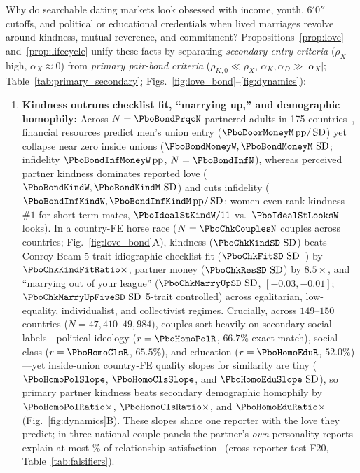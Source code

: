 Why do searchable dating markets look obsessed with income, youth, $6'0''$ cutoffs, and political or educational credentials when lived marriages revolve around kindness, mutual reverence, and commitment? Propositions~\ref{prop:love} and~\ref{prop:lifecycle} unify these facts by separating \emph{secondary entry criteria} ($\rho_X$ high, $\alpha_X\approx 0$) from \emph{primary pair-bond criteria} ($\rho_{K,0}\ll\rho_X$, $\alpha_K,\alpha_D\gg|\alpha_X|$; Table~\ref{tab:primary_secondary}; Figs.~\ref{fig:love_bond}--\ref{fig:dynamics}):
\begin{enumerate}[leftmargin=1.4em,itemsep=1.5pt,topsep=2pt]
\item \textbf{Kindness outruns checklist fit, ``marrying up,'' and demographic homophily:} Across $N=\PboBondPrqcN$ partnered adults in 175 countries~\cite{kowal2025}, financial resources predict men's union entry ($\PboDoorMoneyM\,\mathrm{pp}/\SD$) yet collapse near zero inside unions ($\PboBondMoneyW,\PboBondMoneyM\,\SD$; infidelity $\PboBondInfMoneyW\,\mathrm{pp}$, $N=\PboBondInfN$), whereas perceived partner kindness dominates reported love ($\PboBondKindW,\PboBondKindM\,\SD$) and cuts infidelity ($\PboBondInfKindW,\PboBondInfKindM\,\mathrm{pp}/\SD$; women even rank kindness $\#1$ for short-term mates, $\PboIdealStKindW/11$ vs.\ $\PboIdealStLooksW$ looks). In a country-FE horse race ($N=\PboChkCouplesN$ couples across \PboChkCountriesN{} countries; Fig.~\ref{fig:love_bond}A), kindness ($\PboChkKindSD\,\SD$) beats Conroy-Beam 5-trait idiographic checklist fit ($\PboChkFitSD\,\SD$~\cite{conroybeam2016}) by $\PboChkKindFitRatio\times$, partner money ($\PboChkResSD\,\SD$) by $8.5\times$, and ``marrying out of your league'' ($\PboChkMarryUpSD\,\SD$, $[-0.03,-0.01]$; $\PboChkMarryUpFiveSD\,\SD$ 5-trait controlled) across egalitarian, low-equality, individualist, and collectivist regimes. Crucially, across $149$--$150$ countries ($N=47{,}410$--$49{,}984$), couples sort heavily on secondary social labels---political ideology ($r=\PboHomoPolR$, $66.7\%$ exact match), social class ($r=\PboHomoClsR$, $65.5\%$), and education ($r=\PboHomoEduR$, $52.0\%$)---yet inside-union country-FE quality slopes for similarity are tiny ($\PboHomoPolSlope$, $\PboHomoClsSlope$, and $\PboHomoEduSlope\,\SD$), so primary partner kindness beats secondary demographic homophily by $\PboHomoPolRatio\times$, $\PboHomoClsRatio\times$, and $\PboHomoEduRatio\times$ (Fig.~\ref{fig:dynamics}B). These slopes share one reporter with the love they predict; in three national couple panels the partner's \emph{own} personality reports explain at most \PboLedDyrPartner\% of relationship satisfaction~\cite{dyrenforth2010} (cross-reporter test F20, Table~\ref{tab:falsifiers}).

\end{enumerate}
